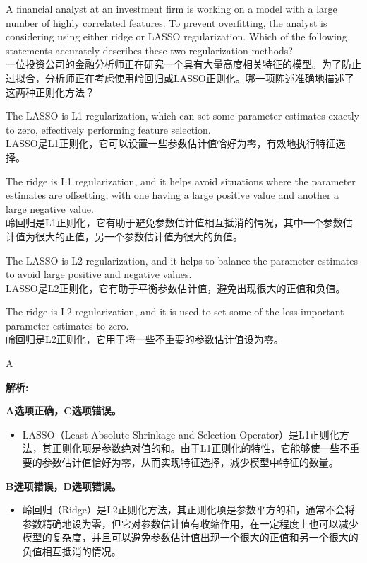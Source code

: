 \documentclass{article}
\newcounter{question} %
\newenvironment{explanation}
{\textbf{解析:}\par}
{\par}
\begin{document}
\begin{question}
    A financial analyst at an investment firm is working on a model with a large number of highly correlated features. To prevent overfitting, the analyst is considering using either ridge or LASSO regularization. Which of the following statements accurately describes these two regularization methods?
    \\一位投资公司的金融分析师正在研究一个具有大量高度相关特征的模型。为了防止过拟合，分析师正在考虑使用岭回归或LASSO正则化。哪一项陈述准确地描述了这两种正则化方法？
    \end{question}
    
    \begin{choices}
        \item The LASSO is L1 regularization, which can set some parameter estimates exactly to zero, effectively performing feature selection.\\
        LASSO是L1正则化，它可以设置一些参数估计值恰好为零，有效地执行特征选择。
        \item The ridge is L1 regularization, and it helps avoid situations where the parameter estimates are offsetting, with one having a large positive value and another a large negative value.\\
        岭回归是L1正则化，它有助于避免参数估计值相互抵消的情况，其中一个参数估计值为很大的正值，另一个参数估计值为很大的负值。
        \item The LASSO is L2 regularization, and it helps to balance the parameter estimates to avoid large positive and negative values.\\
        LASSO是L2正则化，它有助于平衡参数估计值，避免出现很大的正值和负值。
        \item The ridge is L2 regularization, and it is used to set some of the less-important parameter estimates to zero.\\
        岭回归是L2正则化，它用于将一些不重要的参数估计值设为零。
    \end{choices}
    
    \begin{correctanswer}
        A
    \end{correctanswer}
    
    \begin{explanation}
    \textbf{A选项正确，C选项错误。}
    \begin{itemize}
        \item LASSO（Least Absolute Shrinkage and Selection Operator）是L1正则化方法，其正则化项是参数绝对值的和。由于L1正则化的特性，它能够使一些不重要的参数估计值恰好为零，从而实现特征选择，减少模型中特征的数量。
    \end{itemize}
        \textbf{B选项错误，D选项错误。}
    \begin{itemize}
        \item 岭回归（Ridge）是L2正则化方法，其正则化项是参数平方的和，通常不会将参数精确地设为零，但它对参数估计值有收缩作用，在一定程度上也可以减少模型的复杂度，并且可以避免参数估计值出现一个很大的正值和另一个很大的负值相互抵消的情况。
    \end{itemize}
    \end{explanation}
    
\end{document}
